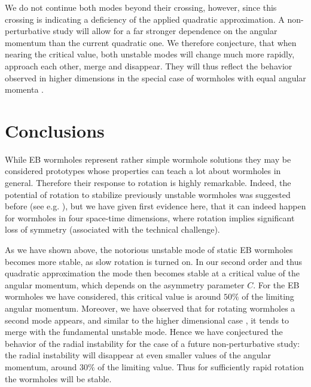 \documentclass{article}
\begin{document}
We do not continue both modes beyond their crossing, however, since {this crossing} is indicating a %
{deficiency} of the applied quadratic approximation.
A non-perturbative study will allow for a far stronger dependence on the angular momentum than the current quadratic one.
We therefore conjecture, that when nearing the critical value, both unstable modes will change much more rapidly, approach each other, merge and disappear.
They will thus reflect the behavior observed in higher dimensions in the special case of wormholes with equal angular momenta \cite{Dzhunushaliev:2013jja}.




\section{Conclusions}

While EB wormholes represent rather simple wormhole solutions they may be considered prototypes whose properties can teach a lot about wormholes in general.
Therefore their response to rotation is highly remarkable.
Indeed, the potential of rotation to stabilize previously unstable wormholes was suggested before (see e.g. \cite{Matos:2005uh}), but we have given first evidence here, that it can indeed happen for wormholes in four space-time dimensions, where rotation implies significant loss of symmetry (associated with the technical challenge).

As we have shown above, the notorious unstable mode of static EB wormholes becomes more stable, as slow rotation is turned on.
In our second order and thus quadratic approximation the mode then becomes stable at a critical value of the angular momentum, which depends on the asymmetry parameter $C$.
For the EB wormholes we have considered, this critical value is around $50\%$ of the limiting angular momentum.
%
Moreover, we have observed that for rotating wormholes a second mode appears, {and} similar to the higher dimensional case \cite{Dzhunushaliev:2013jja}, it tends to merge with the fundamental unstable mode. 
Hence we have conjectured the behavior of the radial instability for the case of a future non-perturbative study: the radial instability will disappear at even smaller values of the angular momentum, around $30\%$ of the limiting {value}. 
%
%
Thus for {sufficiently} rapid rotation the 
%
wormholes will be stable.


\end{document}
